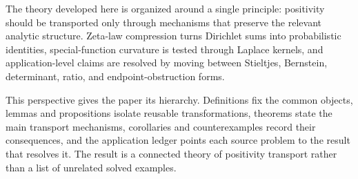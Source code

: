 \documentclass[11pt]{article}
\numberwithin{equation}{section}
\theoremstyle{definition}
\theoremstyle{remark}
\newcommand{\1}{\mathbf 1}
\begin{document}
The theory developed here is organized around a single principle: positivity
should be transported only through mechanisms that preserve the relevant
analytic structure.  Zeta-law compression turns Dirichlet sums into
probabilistic identities, special-function curvature is tested through
Laplace kernels, and application-level claims are resolved by moving between
Stieltjes, Bernstein, determinant, ratio, and endpoint-obstruction forms.

This perspective gives the paper its hierarchy.  Definitions fix the common
objects, lemmas and propositions isolate reusable transformations, theorems
state the main transport mechanisms, corollaries and counterexamples record
their consequences, and the application ledger points each source problem to
the result that resolves it.  The result is a connected theory of positivity
transport rather than a list of unrelated solved examples.
\end{document}

